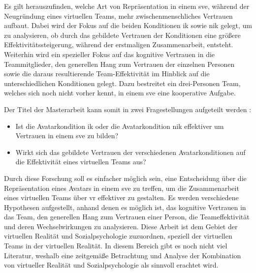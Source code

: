 \documentclass[a4paper,11pt]{article}%
\renewcommand{\\}{\vspace*{0.5\baselineskip} \newline}
\begin{document}


Es gilt herauszufinden, welche Art von Repräsentation in einem \ac{sve}, während der Neugründung eines virtuellen Teams, mehr zwischenmenschliches Vertrauen aufbaut. Dabei wird der Fokus auf die beiden Konditionen \ac{ik} sowie \ac{nik} gelegt, um zu analysieren, ob durch das gebildete Vertrauen der Konditionen eine größere Effektivitätssteigerung, während der erstmaligen Zusammenarbeit, entsteht.
Weiterhin wird ein spezieller Fokus auf das kognitive Vertrauen in die Teammitglieder, den generellen Hang zum Vertrauen der einzelnen Personen sowie die daraus resultierende Team-Effektivität im Hinblick auf die unterschiedlichen Konditionen gelegt. Dazu bestreitet ein drei-Personen Team, welches sich noch nicht vorher kennt, in einem \ac{sve} eine kooperative Aufgabe.

Der Titel der Masterarbeit kann somit in zwei Fragestellungen aufgeteilt werden :
\begin{itemize}
\item Ist die Avatarkondition \ac{ik} oder die Avatarkondition \ac{nik} effektiver um Vertrauen in einem \ac{sve} zu bilden?
\item Wirkt sich das gebildete Vertrauen der verschiedenen Avatarkonditionen auf die Effektivität eines virtuellen Teams aus?
\end{itemize}

	Durch diese Forschung soll es einfacher möglich sein, eine Entscheidung über die Repräsentation eines Avatars in einem \ac{sve} zu treffen, um die Zusammenarbeit eines virtuellen Teams über \ac{vr} effektiver zu gestalten.
Es werden verschiedene Hypothesen aufgestellt, anhand denen es möglich ist, das kognitive Vertrauen in das Team, den generellen Hang zum Vertrauen einer Person, die Teameffektivität und deren Wechselwirkungen zu analysieren.
Diese Arbeit ist dem Gebiet der virtuellen Realität und Sozialpsychologie zuzuordnen, speziell der virtuellen Teams in der virtuellen Realität.
In diesem Bereich gibt es noch nicht viel Literatur, weshalb eine zeitgemäße Betrachtung und Analyse der Kombination von virtueller Realität und Sozialpsychologie als sinnvoll erachtet wird.
\end{document}
